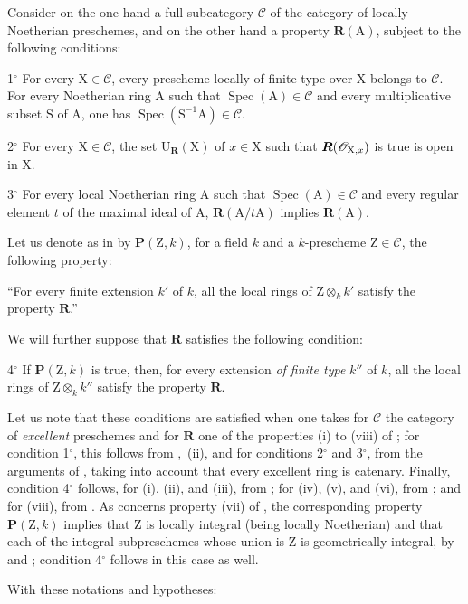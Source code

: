\begin{env}[7.9.7]
\label{IV.7.9.7}
Consider on the one hand a full subcategory $\mathcal{C}$ of the category of locally Noetherian preschemes, and on the other hand a property $\boldsymbol{R}(\mathrm{A})$, subject to the following conditions:

1${}^\circ$ For every $\mathrm{X}\in\mathcal{C}$, every prescheme locally of finite type over $\mathrm{X}$ belongs to $\mathcal{C}$. For every Noetherian ring $\mathrm{A}$ such that $\operatorname{Spec}(\mathrm{A})\in\mathcal{C}$ and every multiplicative subset $\mathrm{S}$ of $\mathrm{A}$, one has $\operatorname{Spec}(\mathrm{S}^{-1}\mathrm{A})\in\mathcal{C}$.

2${}^\circ$ For every $\mathrm{X}\in\mathcal{C}$, the set $\mathrm{U}_{\boldsymbol{R}}(\mathrm{X})$ of $x\in\mathrm{X}$ such that $\boldsymbol{R}(\mathscr{O}_{\mathrm{X},x})$ is true is open in $\mathrm{X}$.

3${}^\circ$ For every local Noetherian ring $\mathrm{A}$ such that $\operatorname{Spec}(\mathrm{A})\in\mathcal{C}$ and every regular element $t$ of the maximal ideal of $\mathrm{A}$, $\boldsymbol{R}(\mathrm{A}/t\mathrm{A})$ implies $\boldsymbol{R}(\mathrm{A})$.

Let us denote as in  by $\boldsymbol{P}(\mathrm{Z},k)$, for a field $k$ and a $k$-prescheme $\mathrm{Z}\in\mathcal{C}$, the following property:

``For every finite extension $k'$ of $k$, all the local rings of $\mathrm{Z}\otimes_k k'$ satisfy the property $\boldsymbol{R}$.''


We will further suppose that $\boldsymbol{R}$ satisfies the following condition:

4${}^\circ$ If $\boldsymbol{P}(\mathrm{Z},k)$ is true, then, for every extension \emph{of finite type} $k''$ of $k$, all the local rings of $\mathrm{Z}\otimes_k k''$ satisfy the property $\boldsymbol{R}$.

Let us note that these conditions are satisfied when one takes for $\mathcal{C}$ the category of \emph{excellent} preschemes and for $\boldsymbol{R}$ one of the properties (i) to (viii) of ; for condition 1${}^\circ$, this follows from ,~(ii), and for conditions 2${}^\circ$ and 3${}^\circ$, from the arguments of , taking into account that every excellent ring is catenary. Finally, condition 4${}^\circ$ follows, for (i), (ii), and (iii), from ; for (iv), (v), and (vi), from ; and for (viii), from . As concerns property (vii) of , the corresponding property $\boldsymbol{P}(\mathrm{Z},k)$ implies that $\mathrm{Z}$ is locally integral (being locally Noetherian) and that each of the integral subpreschemes whose union is $\mathrm{Z}$ is geometrically integral, by  and ; condition 4${}^\circ$ follows in this case as well.

With these notations and hypotheses:
\end{env}

